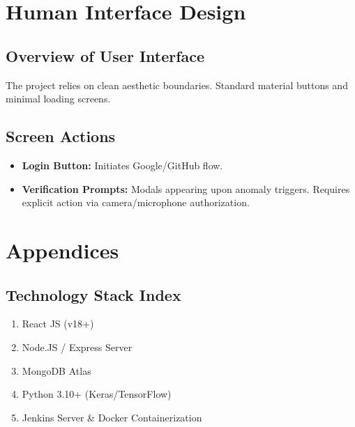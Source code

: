 \documentclass[12pt, a4paper]{article}
\begin{document}
\newpage
\section{Human Interface Design}
\subsection{Overview of User Interface}
The project relies on clean aesthetic boundaries. Standard material buttons and minimal loading screens.

\subsection{Screen Actions}
\begin{itemize}
    \item \textbf{Login Button:} Initiates Google/GitHub flow.
    \item \textbf{Verification Prompts:} Modals appearing upon anomaly triggers. Requires explicit action via camera/microphone authorization.
\end{itemize}

\newpage
\section{Appendices}
\subsection{Technology Stack Index}
\begin{enumerate}
    \item React JS (v18+)
    \item Node.JS / Express Server
    \item MongoDB Atlas
    \item Python 3.10+ (Keras/TensorFlow)
    \item Jenkins Server \& Docker Containerization
\end{enumerate}
\end{document}
